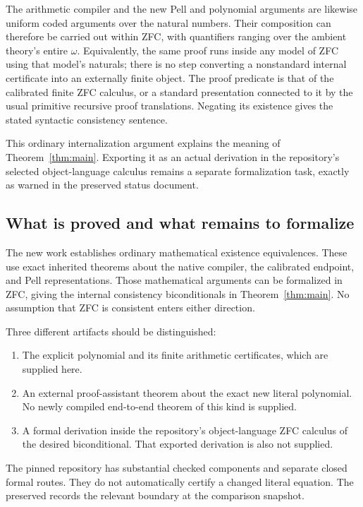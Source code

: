 \documentclass[11pt,a4paper]{article}
\theoremstyle{remark}\newtheorem{remark}[theorem]{Remark}
\begin{document}
The arithmetic compiler and the new Pell and polynomial arguments are
likewise uniform coded arguments over the natural numbers. Their
composition can therefore be carried out within ZFC, with quantifiers
ranging over the ambient theory's entire $\omega$. Equivalently, the
same proof runs inside any model of ZFC using that model's naturals;
there is no step converting a nonstandard internal certificate into an
externally finite object. The proof predicate is that of the calibrated
finite ZFC calculus, or a standard presentation connected to it by the
usual primitive recursive proof translations. Negating its existence
gives the stated syntactic consistency sentence.

This ordinary internalization argument explains the meaning of
Theorem~\ref{thm:main}. Exporting it as an actual derivation in the
repository's selected object-language calculus remains a separate
formalization task, exactly as warned in the preserved status document.

\subsection{What is proved and what remains to formalize}

The new work establishes ordinary mathematical existence equivalences.
These use exact inherited theorems about the native compiler, the
calibrated endpoint, and Pell representations. Those mathematical
arguments can be formalized in ZFC, giving the internal consistency
biconditionals in Theorem~\ref{thm:main}. No assumption that ZFC is
consistent enters either direction.

Three different artifacts should be distinguished:
\begin{enumerate}
\item The explicit polynomial and its finite arithmetic certificates,
which are supplied here.
\item An external proof-assistant theorem about the exact new literal
polynomial. No newly compiled end-to-end theorem of this kind is supplied.
\item A formal derivation inside the repository's object-language ZFC
calculus of the desired biconditional. That exported derivation is also
not supplied.
\end{enumerate}
The pinned repository has substantial checked components and separate
closed formal routes. They do not automatically certify a changed
literal equation. The preserved 
records the relevant boundary at the comparison snapshot.
\end{document}
